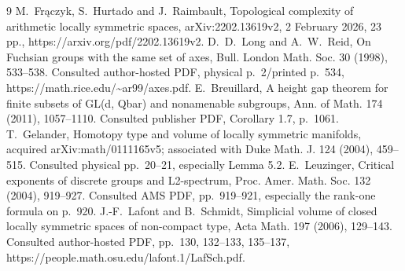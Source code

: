 \documentclass[10pt]{article}
\begin{document}
9 M. Frączyk, S. Hurtado and J. Raimbault, Topological complexity of arithmetic locally symmetric spaces, arXiv:2202.13619v2, 2 February 2026, 23 pp., https://arxiv.org/pdf/2202.13619v2. D. D. Long and A. W. Reid, On Fuchsian groups with the same set of axes, Bull. London Math. Soc. 30 (1998), 533–538. Consulted author-hosted PDF, physical p. 2/printed p. 534, https://math.rice.edu/\textasciitilde{}ar99/axes.pdf. E. Breuillard, A height gap theorem for finite subsets of GL(d, Qbar) and nonamenable subgroups, Ann. of Math. 174 (2011), 1057–1110. Consulted publisher PDF, Corollary 1.7, p. 1061. T. Gelander, Homotopy type and volume of locally symmetric manifolds, acquired arXiv:math/0111165v5; associated with Duke Math. J. 124 (2004), 459–515. Consulted physical pp. 20–21, especially Lemma 5.2. E. Leuzinger, Critical exponents of discrete groups and L2-spectrum, Proc. Amer. Math. Soc. 132 (2004), 919–927. Consulted AMS PDF, pp. 919–921, especially the rank-one formula on p. 920. J.-F. Lafont and B. Schmidt, Simplicial volume of closed locally symmetric spaces of non-compact type, Acta Math. 197 (2006), 129–143. Consulted author-hosted PDF, pp. 130, 132–133, 135–137, https://people.math.osu.edu/lafont.1/LafSch.pdf.\par
\end{document}

